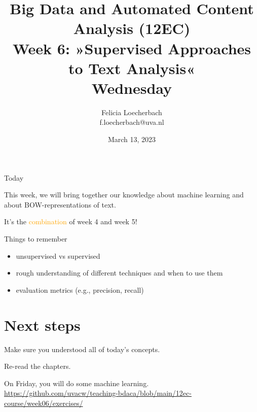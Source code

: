 \documentclass[compress]{beamer}
\begin{document}
\title[Big Data and Automated Content Analysis]{\textbf{Big Data and Automated Content Analysis (12EC)} 
\\Week 6: »Supervised Approaches to Text Analysis«
\\Wednesday}
\author[Felicia Loecherbach]{Felicia Loecherbach\\ \footnotesize{f.loecherbach@uva.nl\\}}
\date{March 13, 2023}


\begin{frame}{}
	\titlepage
\end{frame}

\begin{frame}{Today}
	\tableofcontents
\end{frame}




\begin{frame}[standout]
This week, we will bring together our knowledge about machine learning and about BOW-representations of text.

It's the \textcolor{orange}{combination} of week 4 and week 5!
\end{frame}










\begin{frame}{Things to remember}
  \begin{itemize}
  \item unsupervised vs supervised
  \item rough understanding of different techniques and when to use them
  \item evaluation metrics (e.g., precision, recall)
\end{itemize}
\end{frame}

\section{Next steps}

\begin{frame}[standout]
Make sure you understood all of today's concepts.

Re-read the chapters.

On Friday, you will do some machine learning. \large{\url{https://github.com/uvacw/teaching-bdaca/blob/main/12ec-course/week06/exercises/}}

\end{frame}

\begin{frame}
	\printbibliography
\end{frame}
\end{document}
